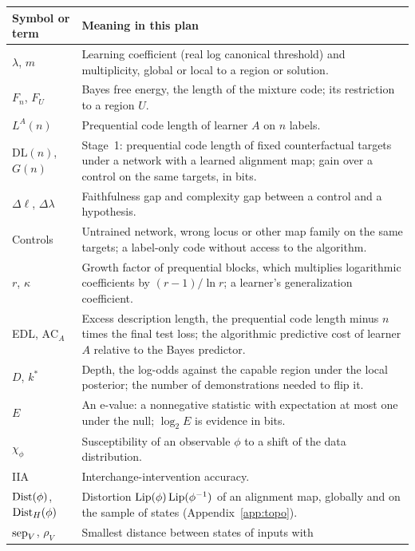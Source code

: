\documentclass[11pt,a4paper]{article}
\newcommand{\DL}{\mathrm{DL}}
\begin{document}
\begin{longtable}{@{}P{3.2cm}P{11.7cm}@{}}
\toprule
Symbol or term & Meaning in this plan \\
\midrule
\endhead
$\lambda$, $m$ & Learning coefficient (real log canonical threshold) and
multiplicity, global or local to a region or solution. \\ \addlinespace
$F_n$, $F_U$ & Bayes free energy, the length of the mixture code; its
restriction to a region $U$. \\ \addlinespace
$L^A(n)$ & Prequential code length of learner $A$ on $n$ labels. \\ \addlinespace
$\DL(n)$, $G(n)$ & Stage~1: prequential code length of fixed counterfactual targets under a network with a learned alignment map; gain over a control on the same targets, in bits. \\ \addlinespace
$\Delta\ell$, $\Delta\lambda$ & Faithfulness gap and complexity gap
between a control and a hypothesis. \\ \addlinespace
Controls & Untrained network, wrong locus or other map family on the same targets; a label-only code without access to the algorithm. \\ \addlinespace
$r$, $\kappa$ & Growth factor of prequential blocks, which multiplies logarithmic coefficients by $(r-1)/\ln r$; a learner's generalization coefficient. \\ \addlinespace
EDL, $\mathrm{AC}_A$ & Excess description length, the prequential code length minus $n$ times the final test loss; the algorithmic predictive cost of learner $A$ relative to the Bayes predictor. \\ \addlinespace
$D$, $k^*$ & Depth, the log-odds against the capable region under the local posterior; the number of demonstrations needed to flip it. \\ \addlinespace
$E$ & An e-value: a nonnegative statistic with expectation at most one under
the null; $\log_2E$ is evidence in bits. \\ \addlinespace
$\chi_\phi$ & Susceptibility of an observable $\phi$ to a shift of the data distribution. \\ \addlinespace
IIA & Interchange-intervention accuracy. \\ \addlinespace
$\operatorname{Dist}(\phi)$, $\operatorname{Dist}_H(\phi)$ & Distortion $\operatorname{Lip}(\phi)\operatorname{Lip}(\phi^{-1})$ of an
alignment map, globally and on the sample of states
(Appendix~\ref{app:topo}). \\ \addlinespace
$\operatorname{sep}_V$, $\rho_V$ & Smallest distance between states of inputs with

\end{longtable}
\end{document}
